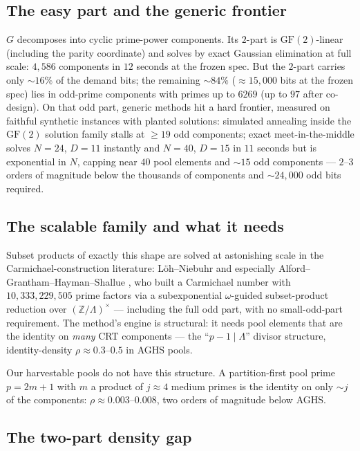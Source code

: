 \documentclass[11pt]{article}
\theoremstyle{remark}
\newcommand{\Z}{\mathbb{Z}}
\begin{document}
\subsection{The easy part and the generic frontier}

$G$ decomposes into cyclic prime-power components. Its $2$-part is
$\mathrm{GF}(2)$-linear (including the parity coordinate) and solves by
exact Gaussian elimination at full scale: $4{,}586$ components in $12$
seconds at the frozen spec. But the $2$-part carries only ${\sim}16\%$ of
the demand bits; the remaining ${\sim}84\%$ ($\approx 15{,}000$ bits at
the frozen spec) lies in odd-prime components with primes up to $6269$
(up to $97$ after co-design). On that odd part, generic methods hit a hard
frontier, measured on faithful synthetic instances with planted solutions:
simulated annealing inside the $\mathrm{GF}(2)$ solution family stalls at
${\ge}19$ odd components; exact meet-in-the-middle solves $N = 24$,
$D = 11$ instantly and $N = 40$, $D = 15$ in $11$ seconds but is
exponential in $N$, capping near $40$ pool elements and ${\sim}15$ odd
components --- $2$--$3$ orders of magnitude below the thousands of
components and ${\sim}24{,}000$ odd bits required.

\subsection{The scalable family and what it needs}

Subset products of exactly this shape are solved at astonishing scale in
the Carmichael-construction literature: L\"oh--Niebuhr \cite{LN} and
especially Alford--Grantham--Hayman--Shallue \cite{AGHS}, who built a
Carmichael number with $10{,}333{,}229{,}505$ prime factors via a
subexponential $\omega$-guided subset-product reduction over
$(\Z/\Lambda)^\times$ --- including the full odd part, with no
small-odd-part requirement. The method's engine is structural: it needs
pool elements that are the identity on \emph{many} CRT components ---
the ``$p - 1 \mid \Lambda$'' divisor structure, identity-density
$\rho \approx 0.3$--$0.5$ in AGHS pools.

Our harvestable pools do not have this structure. A partition-first pool
prime $p = 2m + 1$ with $m$ a product of $j \approx 4$ medium primes is
the identity on only ${\sim}j$ of the components:
$\rho \approx 0.003$--$0.008$, two orders of magnitude below AGHS.

\subsection{The two-part density gap}
\end{document}
